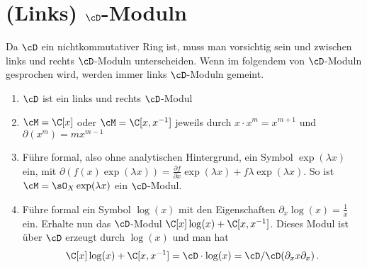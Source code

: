 \section{(Links) $\cD$-Moduln}
Da $\cD$ ein nichtkommutativer Ring ist, muss man vorsichtig sein und zwischen
links und rechts $\cD$-Moduln unterscheiden.
Wenn im folgendem von $\cD$-Moduln gesprochen wird, werden immer
links $\cD$-Moduln gemeint.

\begin{exmp}
\cite[Exmp 2.2]{ArkhipovDmod}
\begin{enumerate}
%
\item $\cD$ ist ein links und rechts $\cD$-Modul
%
\item $\cM=\C[x]$ oder $\cM=\C[x,x^{-1}]$ jeweils durch $x\cdot x^{m}=x^{m+1}$
und $\partial(x^m)=mx^{m-1}$
%
\item \cite[Exmp 2.2]{ArkhipovDmod}
Führe formal, also ohne analytischen Hintergrund, ein Symbol
$\exp(\lambda x)$ ein, mit $\partial(f(x)\exp(\lambda x))=\frac{\partial
f}{\partial x}\exp(\lambda x)+f\lambda\exp(\lambda x)$.  So ist
$\cM=\sO_X\exp(\lambda x)$ ein $\cD$-Modul.
%
\item \cite[Exmp 3.1.4]{ginzburg}
Führe formal ein Symbol $\log(x)$ mit den Eigenschaften
$\partial_x\log(x)=\frac{1}{x}$ ein. Erhalte nun das $\cD$-Modul
$\C[x]\log(x)+\C[x,x^{-1}]$. Dieses Modul ist über $\cD$ erzeugt durch
$\log(x)$ und man hat
\[
\C[x]\log(x)+\C[x,x^{-1}]=\cD\cdot\log(x)=\cD\slash\cD(\partial_x x\partial_x) \,.
\]
%
\end{enumerate}
\end{exmp}

\begin{comment}
\begin{lem}\cite[Lem 2.3.3.]{sabbah_cimpa90}
Sei $\cM$ ein links $\cD$-Modul von endlichem Typ, welches auch von endlichem
Typ über $\Ckx$ ist. Dann ist $\cM$ bereits ein freies $\C\{x\}$-Modul.
\end{lem}
\begin{proof}
Siehe \cite[Lem 2.3.3.]{sabbah_cimpa90}.
\end{proof}
\begin{cor} \cite[Cor 2.3.4.]{sabbah_cimpa90}
Falls $\cM$ ein links $\cD$-Modul von endlichem Typ, welches außerdem ein
endlich dimensionaler Vektorraum ist, so ist schon $\cM=\{0\}$.
\end{cor}
\end{comment}

